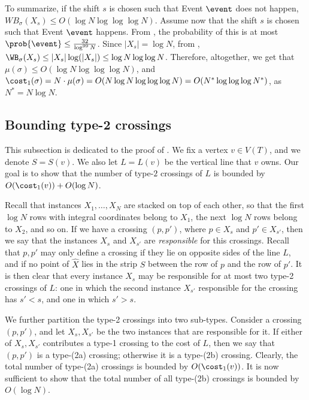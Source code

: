 To summarize, if the shift $s$ is chosen such that Event $\event$ does not happen,  	 $WB_{\sigma}(X_s)\leq O(\log N \log\log\log N)$. Assume now that the shift $s$ is chosen such that Event $\event$ happens. From , the probability of this is at most 	 $\prob{\event}\leq \frac{32}{\log^{99}N}$. Since $|X_s|=\log N$, from , $\WB_{\sigma}(X_s)\leq |X_s|\log(|X_s|)\leq \log N\log\log N$. Therefore, altogether, we get that $\mu(\sigma)\leq O(\log N\log\log\log N)$, and $\cost_1(\sigma)=N\cdot \mu(\sigma)=O(N\log N\log\log\log N)=O(N^*\log\log\log N^*)$, as $N^*=N\log N$.


%
%
%
\subsection{Bounding type-2 crossings}\label{subsec:type-2} 
%
%
%

This subsection is dedicated to the proof of . We fix a vertex $v\in V(T)$, and we denote $S=S(v)$. We also let $L = L(v)$ be the vertical line that $v$ owns. 
Our goal is to show that the number of type-$2$ crossings of $L$ is bounded by $O(\cost_1(v))+O(\log N)$.

Recall that instances $X_1,\ldots,X_N$ are stacked on top of each other, so that the first $\log N$ rows with integral coordinates  belong to $X_1$, the next $\log N$ rows belong to $X_2$, and so on. If we have a crossing $(p,p')$, where $p\in X_s$ and $p'\in X_{s'}$, then we say that the instances $X_s$ and $X_{s'}$ are \emph{responsible} for this crossings. Recall that $p,p'$ may only define a crossing if they lie on opposite sides of the line $L$, and if no point of $\hat X$ lies in the strip $S$ between the row of $p$ and the row of $p'$. It is then clear that every instance $X_s$ may be responsible for at most two type-2 crossings of $L$: one in which the second instance $X_{s'}$ responsible for the crossing has $s'<s$, and one in which $s'>s$.

We further partition the type-2 crossings into two sub-types. Consider a crossing $(p,p')$, and let $X_s,X_{s'}$ be the two instances that are responsible for it. If either of $X_s,X_{s'}$ contributes a type-1 crossing to the cost of $L$, then we say that $(p,p')$ is a type-(2a) crossing; otherwise it is a type-(2b) crossing. Clearly, the total number of type-(2a) crossings is bounded by $O(\cost_1(v))$. It is now sufficient to show that the total number of all type-(2b) crossings is bounded by $O(\log N)$.

